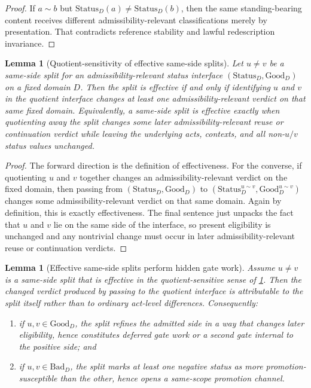 \documentclass[11pt]{article}
\theoremstyle{plain}
\newtheorem{lemma}[theorem]{Lemma}
\theoremstyle{definition}
\newcommand{\Law}{\sim}
\newcommand{\domain}{D}
\newcommand{\Good}{\mathrm{Good}}
\newcommand{\Bad}{\mathrm{Bad}}
\begin{document}
\begin{proof}
If $a\Law b$ but $\mathrm{Status}_\domain(a)\neq \mathrm{Status}_\domain(b)$, then the same standing-bearing content receives different admissibility-relevant classifications merely by presentation. That contradicts reference stability and lawful redescription invariance.
\end{proof}

\begin{lemma}[Quotient-sensitivity of effective same-side splits]
\label{lem:B-quotient-sensitive}
Let $u\neq v$ be a same-side split for an admissibility-relevant status interface $(\mathrm{Status}_\domain,\Good_\domain)$ on a fixed domain $\domain$. Then the split is effective if and only if identifying $u$ and $v$ in the quotient interface changes at least one admissibility-relevant verdict on that same fixed domain. Equivalently, a same-side split is effective exactly when quotienting away the split changes some later admissibility-relevant reuse or continuation verdict while leaving the underlying acts, contexts, and all non-$u/v$ status values unchanged.
\end{lemma}

\begin{proof}
The forward direction is the definition of effectiveness. For the converse, if quotienting $u$ and $v$ together changes an admissibility-relevant verdict on the fixed domain, then passing from $(\mathrm{Status}_\domain,\Good_\domain)$ to $(\mathrm{Status}^{u\sim v}_\domain,\Good^{u\sim v}_\domain)$ changes some admissibility-relevant verdict on that same domain. Again by definition, this is exactly effectiveness. The final sentence just unpacks the fact that $u$ and $v$ lie on the same side of the interface, so present eligibility is unchanged and any nontrivial change must occur in later admissibility-relevant reuse or continuation verdicts.
\end{proof}

\begin{lemma}[Effective same-side splits perform hidden gate work]
\label{lem:B-hidden-gate}
Assume $u\neq v$ is a same-side split that is effective in the quotient-sensitive sense of \cref{lem:B-quotient-sensitive}. Then the changed verdict produced by passing to the quotient interface is attributable to the split itself rather than to ordinary act-level differences. Consequently:
\begin{enumerate}[label=(\roman*), leftmargin=2.5em]
    \item if $u,v\in \Good_\domain$, the split refines the admitted side in a way that changes later eligibility, hence constitutes deferred gate work or a second gate internal to the positive side; and
    \item if $u,v\in \Bad_\domain$, the split marks at least one negative status as more promotion-susceptible than the other, hence opens a same-scope promotion channel.
\end{enumerate}
\end{lemma}
\end{document}
